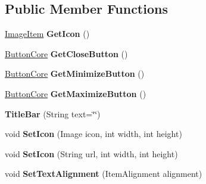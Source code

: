 \subsection*{Public Member Functions}
\begin{DoxyCompactItemize}
\item 
\mbox{\label{class_space_v_i_l_1_1_title_bar_ac9e6f6019a10739840550125dcdf01e0}} 
\mbox{\hyperlink{class_space_v_i_l_1_1_image_item}{Image\+Item}} {\bfseries Get\+Icon} ()
\item 
\mbox{\label{class_space_v_i_l_1_1_title_bar_ac0f2c2e7fbd3e81c7bf5eea7a216988b}} 
\mbox{\hyperlink{class_space_v_i_l_1_1_button_core}{Button\+Core}} {\bfseries Get\+Close\+Button} ()
\item 
\mbox{\label{class_space_v_i_l_1_1_title_bar_a90009951aeff1f29c887aac28cba19f6}} 
\mbox{\hyperlink{class_space_v_i_l_1_1_button_core}{Button\+Core}} {\bfseries Get\+Minimize\+Button} ()
\item 
\mbox{\label{class_space_v_i_l_1_1_title_bar_a0e5d71f5effe83e1a6edf4a5243b02e8}} 
\mbox{\hyperlink{class_space_v_i_l_1_1_button_core}{Button\+Core}} {\bfseries Get\+Maximize\+Button} ()
\item 
\mbox{\label{class_space_v_i_l_1_1_title_bar_aa07b847218108ae09ab3e7190c8c9bf0}} 
{\bfseries Title\+Bar} (String text=\char`\"{}\char`\"{})
\item 
\mbox{\label{class_space_v_i_l_1_1_title_bar_a74f0ca4e94eda76fba9e15a87c536a23}} 
void {\bfseries Set\+Icon} (Image icon, int width, int height)
\item 
\mbox{\label{class_space_v_i_l_1_1_title_bar_a8467aef4870ae71ad71987c415bfc1ca}} 
void {\bfseries Set\+Icon} (String url, int width, int height)
\item 
\mbox{\label{class_space_v_i_l_1_1_title_bar_a4829092a945c644e6d04d9583dc20baa}} 
void {\bfseries Set\+Text\+Alignment} (Item\+Alignment alignment)
\item 

\end{DoxyCompactItemize}
